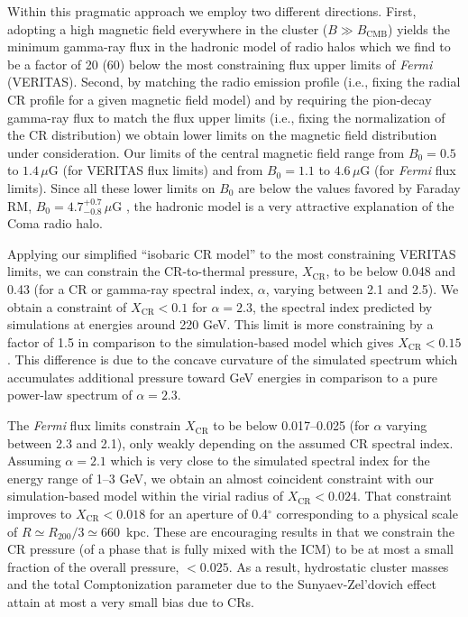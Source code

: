 \documentclass[12pt,manuscript]{aastex}
\newcommand{\rmn}{\mathrm}
\newcommand{\CR}{\mathrm{CR}}
\begin{document}
Within this pragmatic approach we employ two different directions. First, adopting a high magnetic
field everywhere in the cluster ($B\gg B_\rmn{CMB}$) yields the minimum gamma-ray flux in the
hadronic model of radio halos which we find to be a factor of 20 (60) below the most constraining
flux upper limits of {\em Fermi} (VERITAS). Second, by matching the radio emission profile (i.e.,
fixing the radial CR profile for a given magnetic field model) and by requiring the pion-decay
gamma-ray flux to match the flux upper limits (i.e., fixing the normalization of the CR
distribution) we obtain lower limits on the magnetic field distribution under consideration. Our
limits of the central magnetic field range from $B_{0} = 0.5$ to $1.4\,\mu$G (for VERITAS  flux
limits) and from $B_{0} = 1.1$ to $4.6\,\mu$G (for {\em Fermi} flux limits). Since all these lower
limits on $B_0$ are below the values favored by Faraday RM, $B_{0} = 4.7^{+0.7}_{-0.8}\,\mu$G
\citep{article:Bonafede_etal:2010}, the hadronic model is a very attractive explanation of the Coma
radio halo.

Applying our simplified ``isobaric CR model'' to the most constraining VERITAS limits, we can
constrain the CR-to-thermal pressure, $X_\CR$, to be below 0.048 and 0.43 (for a CR or gamma-ray
spectral index, $\alpha$, varying between 2.1 and 2.5). We obtain a constraint of $X_\CR<0.1$ for
$\alpha=2.3$, the spectral index predicted by simulations at energies around 220 GeV.  This limit
is more constraining by a factor of 1.5 in comparison to the simulation-based model which gives
$X_\CR<0.15$.  This difference is due to the concave curvature of the simulated spectrum which
accumulates additional pressure toward GeV energies in comparison to a pure power-law spectrum of
$\alpha=2.3$.

The {\em Fermi} flux limits constrain $X_\CR$ to be below 0.017--0.025 (for $\alpha$ varying
between 2.3 and 2.1), only weakly depending on the assumed CR spectral index. Assuming $\alpha=2.1$
which is very close to the simulated spectral index for the energy range of 1--3 GeV, we obtain an
almost coincident constraint with our simulation-based model within the virial radius of
$X_\CR<0.024$. That constraint improves to $X_{\CR}<0.018$ for an aperture of 0.4$^\circ$
corresponding to a physical scale of $R \simeq R_{200}/3 \simeq 660$~kpc. These are encouraging
results in that we constrain the CR pressure (of a phase that is fully mixed with the ICM) to be at
most a small fraction of the overall pressure, $<0.025$. As a result, hydrostatic cluster masses
and the total Comptonization parameter due to the Sunyaev-Zel'dovich effect attain at most a very
small bias due to CRs.
\end{document}
